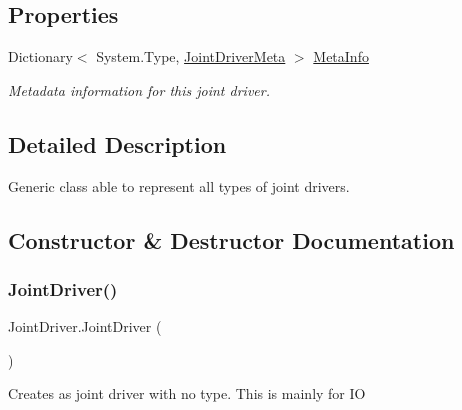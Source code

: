 \subsection*{Properties}
\begin{DoxyCompactItemize}
\item 
Dictionary$<$ System.\+Type, \hyperlink{class_joint_driver_meta}{Joint\+Driver\+Meta} $>$ \hyperlink{class_joint_driver_ac9ee45562c190ff7ac8fdb4a5cedb0ad}{Meta\+Info}
\begin{DoxyCompactList}\small\item\em Metadata information for this joint driver. \end{DoxyCompactList}\end{DoxyCompactItemize}


\subsection{Detailed Description}
Generic class able to represent all types of joint drivers. 



\subsection{Constructor \& Destructor Documentation}
\mbox{\label{class_joint_driver_aa9024a29db9bdac4465e244544521718}} 
\subsubsection{\texorpdfstring{Joint\+Driver()}{JointDriver()}\hspace{0.1cm}{\footnotesize\ttfamily [1/2]}}
{\footnotesize\ttfamily Joint\+Driver.\+Joint\+Driver (\begin{DoxyParamCaption}{ }\end{DoxyParamCaption})}



Creates as joint driver with no type. This is mainly for IO 

\mbox{\label{class_joint_driver_a8fcc7584ca80fb8f69e855be6fbe488f}} 
